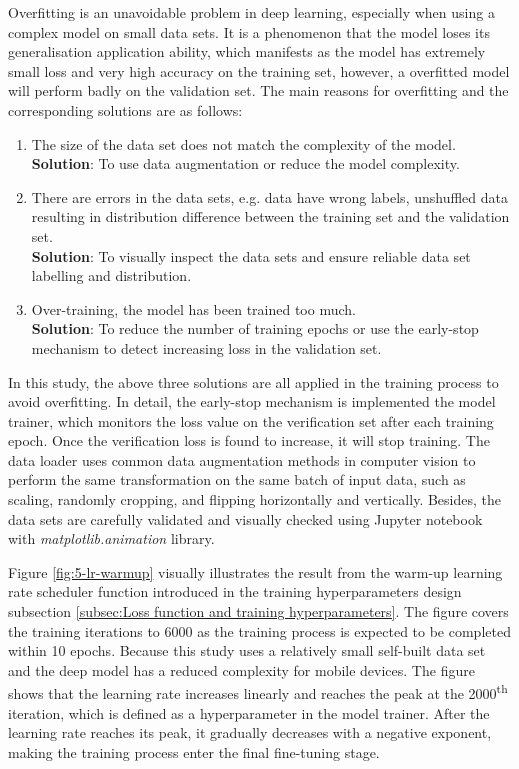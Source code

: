 Overfitting is an unavoidable problem in deep learning, especially when using a complex model on small data sets.
It is a phenomenon that the model loses its generalisation application ability, which manifests as the model has extremely small loss and very high accuracy on the training set, however, a overfitted model will perform badly on the validation set. 
The main reasons for overfitting and the corresponding solutions are as follows:
\begin{enumerate}
    \item The size of the data set does not match the complexity of the model. \\ \textbf{Solution}: To use data augmentation or reduce the model complexity.
    \item There are errors in the data sets, e.g. data have wrong labels, unshuffled data resulting in distribution difference between the training set and the validation set. \\
    \textbf{Solution}: To visually inspect the data sets and ensure reliable data set labelling and distribution.
    \item Over-training, the model has been trained too much. \\
    \textbf{Solution}: To reduce the number of training epochs or use the early-stop mechanism to detect increasing loss in the validation set.
\end{enumerate}

In this study, the above three solutions are all applied in the training process to avoid overfitting.
In detail, the early-stop mechanism is implemented the model trainer, which monitors the loss value on the verification set after each training epoch.
Once the verification loss is found to increase, it will stop training.
The data loader uses common data augmentation methods in computer vision to perform the same transformation on the same batch of input data, such as scaling, randomly cropping, and flipping horizontally and vertically.
Besides, the data sets are carefully validated and visually checked using Jupyter notebook with \textit{matplotlib.animation} library.

Figure \ref{fig:5-lr-warmup} visually illustrates the result from the warm-up learning rate scheduler function introduced in the training hyperparameters design subsection \ref{subsec:Loss function and training hyperparameters}.
The figure covers the training iterations to 6000 as the training process is expected to be completed within 10 epochs.
Because this study uses a relatively small self-built data set and the deep model has a reduced complexity for mobile devices.
The figure shows that the learning rate increases linearly and reaches the peak at the 2000\textsuperscript{th} iteration, which is defined as a hyperparameter in the model trainer.
After the learning rate reaches its peak, it gradually decreases with a negative exponent, making the training process enter the final fine-tuning stage.


